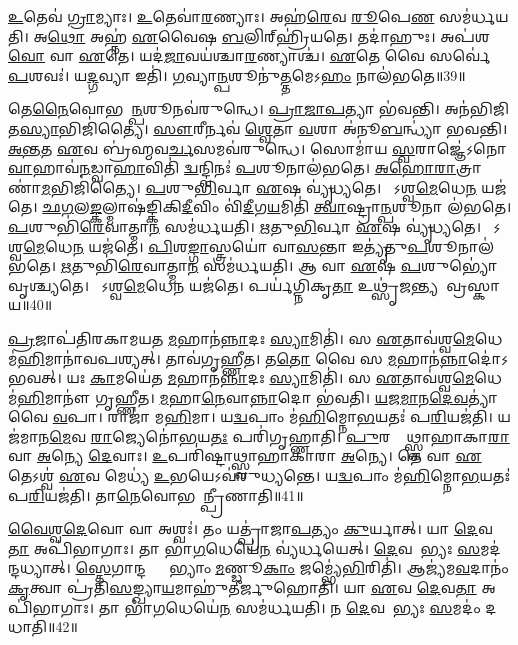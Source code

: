 \ul{𑌉}𑌤𑍇𑌵॑ \ul{𑌗𑍍𑌰𑌾}𑌮𑍍𑌯𑌾𑌃।
\ul{𑌉}𑌤𑍇𑌵𑌾॑\ul{𑌰}𑌣𑍍𑌯𑌾𑌃।
𑌅𑌹॑\ul{𑌰𑍇}𑌵 \ul{𑌰𑍂}𑌪𑍇\ul{𑌣} 𑌸𑌮॑𑌰𑍍𑌧𑌯𑌤𑌿।
𑌅\ul{𑌥𑍋} 𑌅𑌹𑍍𑌨॑ \ul{𑌏}𑌵𑍈𑌷 \ul{𑌬}𑌲𑌿𑌰𑍍‌\mbox{}𑌹𑍍𑌰𑌿॑𑌯𑌤𑍇।
𑌤𑌦𑌾॑𑌹𑍁𑌃।
𑌅𑌪॑𑌶\ul{𑌵𑍋} 𑌵𑌾 \ul{𑌏}𑌤𑍇।
𑌯𑌦॑\ul{𑌜𑌾}𑌵𑌯॑𑌶𑍍𑌚𑌾\ul{𑌰}𑌣𑍍𑌯𑌾𑌶𑍍𑌚॑।
\ul{𑌏}𑌤𑍇 𑌵𑍈 𑌸𑌰𑍍𑌵𑍇॑ \ul{𑌪}𑌶𑌵𑌃॑।
𑌯\ul{𑌦𑍍𑌗}𑌵𑍍𑌯𑌾 𑌇𑌤𑌿॑।
\ul{𑌗}𑌵𑍍𑌯𑌾\ul{𑌨𑍍𑌪}𑌶𑍂𑌨𑍁॑\ul{𑌤𑍍𑌤}𑌮𑍇𑌽\ul{𑌹𑌂} 𑌨𑌾𑌲॑𑌭𑌤𑍇॥39॥

𑌤𑍇\ul{𑌨𑍈}𑌵𑍋𑌭𑌯𑌾᳚\ul{𑌨𑍍𑌪}𑌶𑍂𑌨𑌵॑𑌰𑍁𑌨𑍍𑌧𑍇।
\ul{𑌪𑍍𑌰𑌾}\ul{𑌜𑌾}\ul{𑌪}𑌤𑍍𑌯𑌾 𑌭॑𑌵𑌨𑍍𑌤𑌿।
𑌅𑌨॑𑌭𑌿𑌜𑌿𑌤\ul{𑌸𑍍𑌯𑌾}𑌭𑌿𑌜𑌿॑𑌤𑍍𑌯𑍈।
\ul{𑌸𑍗}𑌰𑍀𑌰𑍍𑌨𑌵॑ \ul{𑌶𑍍𑌵𑍇}𑌤𑌾 \ul{𑌵}𑌶𑌾 𑌅॑𑌨𑍂\ul{𑌬}𑌨𑍍𑌧𑍍𑌯𑌾॑ 𑌭𑌵𑌨𑍍𑌤𑌿।
\ul{𑌅}\ul{𑌨𑍍𑌤}𑌤 \ul{𑌏}𑌵 𑌬𑍍𑌰॑𑌹𑍍𑌮𑌵\ul{𑌰𑍍𑌚}𑌸𑌮𑌵॑𑌰𑍁𑌨𑍍𑌧𑍇।
𑌸𑍋𑌮𑌾॑𑌯 \ul{𑌸𑍍𑌵}𑌰𑌾𑌜𑍍𑌞𑍇॑\-𑌽𑌨𑍋\ul{𑌵𑌾}𑌹𑌾𑌵॑\ul{𑌨}𑌡𑍍𑌵𑌾\ul{𑌹𑌾}𑌵𑌿𑌤𑌿॑ \ul{𑌦𑍍𑌵}𑌨𑍍𑌦𑍍𑌵𑌿𑌨𑌃॑ \ul{𑌪}𑌶𑍂𑌨𑌾𑌲॑𑌭𑌤𑍇।
\ul{𑌅}\ul{𑌹𑍋}\ul{𑌰𑌾}𑌤𑍍𑌰𑌾𑌣𑌾॑\ul{𑌮}𑌭𑌿𑌜𑌿॑𑌤𑍍𑌯𑍈।
\ul{𑌪}𑌶𑍁\ul{𑌭𑌿}𑌰𑍍𑌵𑌾 \ul{𑌏}𑌷 𑌵𑍍𑌯𑍃॑𑌧𑍍𑌯𑌤𑍇।
𑌯𑍋᳚𑌽𑌶𑍍𑌵\ul{𑌮𑍇}𑌧𑍇\ul{𑌨} 𑌯𑌜॑𑌤𑍇।
\ul{𑌛}\ul{𑌗}𑌲\ul{𑌙𑍍𑌕}𑌲𑍍𑌮𑌾𑌷॑𑌙𑍍𑌕𑌿𑌕𑌿\ul{𑌦𑍀}𑌵𑌿𑌂 𑌵𑌿॑\ul{𑌦𑍀}𑌗\ul{𑌯}𑌮𑌿𑌤𑌿॑ \ul{𑌤𑍍𑌵𑌾}𑌷𑍍𑌟𑍍𑌰𑌾\ul{𑌨𑍍𑌪}𑌶𑍂𑌨𑌾 𑌲॑𑌭𑌤𑍇।
\ul{𑌪}𑌶𑍁𑌭𑌿॑\ul{𑌰𑍇}𑌵𑌾𑌤𑍍𑌮𑌾\ul{𑌨}\ul{} 𑌸𑌮॑𑌰𑍍𑌧𑌯𑌤𑌿।
\ul{𑌋}𑌤𑍁\ul{𑌭𑌿}𑌰𑍍𑌵𑌾 \ul{𑌏}𑌷 𑌵𑍍𑌯𑍃॑𑌧𑍍𑌯𑌤𑍇।
𑌯𑍋᳚𑌽𑌶𑍍𑌵\ul{𑌮𑍇}𑌧𑍇\ul{𑌨} 𑌯𑌜॑𑌤𑍇।
\ul{𑌪𑌿}𑌶\ul{𑌙𑍍𑌗𑌾}𑌸𑍍𑌤𑍍𑌰𑌯𑍋॑ 𑌵𑌾\ul{𑌸}𑌨𑍍𑌤𑌾 𑌇𑌤𑍍𑌯𑍃॑𑌤𑍁\ul{𑌪}𑌶𑍂𑌨𑌾𑌲॑𑌭𑌤𑍇।
\ul{𑌋}𑌤𑍁𑌭𑌿॑\ul{𑌰𑍇}𑌵𑌾𑌤𑍍𑌮𑌾\ul{𑌨}\ul{} 𑌸𑌮॑𑌰𑍍𑌧𑌯𑌤𑌿।
𑌆 𑌵𑌾 \ul{𑌏}𑌷 \ul{𑌪}𑌶𑍁𑌭𑍍𑌯𑍋॑ 𑌵𑍃𑌶𑍍𑌚𑍍𑌯𑌤𑍇।
𑌯𑍋᳚𑌽𑌶𑍍𑌵\ul{𑌮𑍇}𑌧𑍇\ul{𑌨} 𑌯𑌜॑𑌤𑍇।
𑌪𑌰𑍍𑌯॑𑌗𑍍𑌨𑌿𑌕𑍃\ul{𑌤𑌾} 𑌉𑌥𑍍𑌸𑍃॑\ul{𑌜}𑌨𑍍𑌤𑍍𑌯𑌨𑌾᳚𑌵𑍍𑌰𑌸𑍍𑌕𑌾𑌯॥40॥\anuvakamend[\ul{𑌲}\ul{𑌭𑍍𑌯}\ul{𑌨𑍍𑌤𑍇} \ul{𑌲}\ul{𑌭}\ul{𑌤𑍇} \ul{𑌤𑍍𑌵𑌾}𑌷𑍍𑌟𑍍𑌰𑌾\ul{𑌨𑍍𑌪}𑌶𑍂𑌨𑌾𑌲॑𑌭\ul{𑌤𑍇}\-𑌽𑌷𑍍𑌟𑍗 𑌚॑]

\ul{𑌪𑍍𑌰}𑌜𑌾𑌪॑𑌤𑌿𑌰𑌕𑌾𑌮𑌯𑌤 \ul{𑌮}𑌹𑌾𑌨॑\ul{𑌨𑍍𑌨𑌾}𑌦𑌃 \ul{𑌸𑍍𑌯𑌾}𑌮𑌿𑌤𑌿॑।
𑌸 \ul{𑌏}𑌤𑌾𑌵॑𑌶𑍍𑌵\ul{𑌮𑍇}𑌧𑍇 𑌮॑\ul{𑌹𑌿}𑌮𑌾𑌨𑌾॑𑌵𑌪𑌶𑍍𑌯𑌤𑍍।
𑌤𑌾𑌵॑𑌗𑍃𑌹𑍍𑌣𑍀𑌤।
𑌤\ul{𑌤𑍋} 𑌵𑍈 𑌸 \ul{𑌮}𑌹𑌾𑌨॑\ul{𑌨𑍍𑌨𑌾}𑌦𑍋॑\-𑌽𑌭𑌵𑌤𑍍।
𑌯𑌃 \ul{𑌕𑌾}𑌮𑌯𑍇॑𑌤 \ul{𑌮}𑌹𑌾𑌨॑\ul{𑌨𑍍𑌨𑌾}𑌦𑌃 \ul{𑌸𑍍𑌯𑌾}𑌮𑌿𑌤𑌿॑।
𑌸 \ul{𑌏}𑌤𑌾𑌵॑𑌶𑍍𑌵\ul{𑌮𑍇}𑌧𑍇 𑌮॑\ul{𑌹𑌿}𑌮𑌾𑌨𑍗॑ 𑌗𑍃𑌹𑍍𑌣𑍀𑌤।
\ul{𑌮}𑌹𑌾\ul{𑌨𑍇}𑌵𑌾\ul{𑌨𑍍𑌨𑌾}𑌦𑍋 𑌭॑𑌵𑌤𑌿।
\ul{𑌯}\ul{𑌜}\ul{𑌮𑌾}\ul{𑌨}\ul{𑌦𑍇}\ul{𑌵}𑌤𑍍𑌯𑌾॑ 𑌵𑍈 \ul{𑌵}𑌪𑌾।
𑌰𑌾𑌜𑌾॑ 𑌮\ul{𑌹𑌿}𑌮𑌾।
𑌯\ul{𑌦𑍍𑌵}𑌪𑌾𑌂 𑌮॑\ul{𑌹𑌿}𑌮𑍍𑌨𑍋\ul{𑌭}𑌯𑌤𑌃॑ 𑌪\ul{𑌰𑌿}𑌯𑌜॑𑌤𑌿।
𑌯𑌜॑𑌮𑌾𑌨\ul{𑌮𑍇}𑌵 \ul{𑌰𑌾}𑌜𑍍𑌯𑍇𑌨𑍋॑\ul{𑌭}𑌯\ul{𑌤𑌃} 𑌪𑌰𑌿॑𑌗𑍃𑌹𑍍𑌣𑌾𑌤𑌿।
\ul{𑌪𑍁}𑌰𑌸𑍍𑌤𑌾᳚𑌥𑍍𑌸𑍍𑌵𑌾𑌹𑌾𑌕𑌾\ul{𑌰𑌾} 𑌵𑌾 \ul{𑌅}𑌨𑍍𑌯𑍇 \ul{𑌦𑍇}𑌵𑌾𑌃।
\ul{𑌉}𑌪𑌰𑌿॑𑌷𑍍𑌟𑌾𑌥𑍍𑌸𑍍𑌵𑌾𑌹𑌾𑌕𑌾𑌰𑌾 \ul{𑌅}𑌨𑍍𑌯𑍇।
𑌤𑍇 𑌵𑌾 \ul{𑌏}𑌤𑍇\-𑌽𑌶𑍍𑌵॑ \ul{𑌏}𑌵 𑌮𑍇𑌧𑍍𑌯॑ \ul{𑌉}𑌭𑌯𑍇\-𑌽𑌵॑𑌰𑍁𑌧𑍍𑌯𑌨𑍍𑌤𑍇।
𑌯\ul{𑌦𑍍𑌵}𑌪𑌾𑌂 𑌮॑\ul{𑌹𑌿}𑌮𑍍𑌨𑍋\ul{𑌭}𑌯𑌤𑌃॑ 𑌪\ul{𑌰𑌿}𑌯𑌜॑𑌤𑌿।
𑌤𑌾\ul{𑌨𑍇}𑌵𑍋𑌭𑌯𑌾᳚𑌨𑍍𑌪𑍍𑌰𑍀𑌣𑌾𑌤𑌿॥41॥\anuvakamend[\ul{𑌪}\ul{𑌰𑌿}𑌯𑌜॑\ul{𑌤𑌿} 𑌷𑌟𑍍𑌚॑]

\ul{𑌵𑍈}\ul{𑌶𑍍𑌵}\ul{𑌦𑍇}𑌵𑍋 𑌵𑌾 𑌅𑌶𑍍𑌵𑌃॑।
𑌤𑌂 𑌯𑌤𑍍𑌪𑍍𑌰𑌾॑𑌜𑌾\ul{𑌪}𑌤𑍍𑌯𑌂 \ul{𑌕𑍁}𑌰𑍍𑌯𑌾𑌤𑍍।
𑌯𑌾 \ul{𑌦𑍇}𑌵\ul{𑌤𑌾} 𑌅𑌪𑌿॑𑌭𑌾𑌗𑌾𑌃।
𑌤𑌾 𑌭𑌾॑\ul{𑌗}𑌧𑍇𑌯𑍇॑\ul{𑌨} 𑌵𑍍𑌯॑𑌰𑍍𑌧𑌯𑍇𑌤𑍍।
\ul{𑌦𑍇}𑌵𑌤𑌾᳚𑌭𑍍𑌯𑌃 \ul{𑌸}𑌮𑌦॑𑌨𑍍𑌦𑌧𑍍𑌯𑌾𑌤𑍍।
\ul{𑌸𑍍𑌤𑍇}𑌗𑌾𑌨𑍍𑌦𑌷𑍍𑌟𑍍𑌰𑌾᳚𑌭𑍍𑌯𑌾𑌂 \ul{𑌮}𑌣𑍍𑌡𑍂\ul{𑌕𑌾𑌂} 𑌜𑌮𑍍𑌭𑍍𑌯𑍇॑\ul{𑌭𑌿}𑌰𑌿𑌤𑌿॑।
𑌆𑌜𑍍𑌯॑𑌮\ul{𑌵}𑌦𑌾𑌨𑌂॑ \ul{𑌕𑍃}𑌤𑍍𑌵𑌾 𑌪𑍍𑌰॑𑌤𑌿\ul{𑌸}𑌙𑍍𑌖𑍍𑌯𑌾\ul{𑌯}𑌮𑌾𑌹𑍁॑𑌤𑍀𑌰𑍍𑌜𑍁𑌹𑍋𑌤𑌿।
𑌯𑌾 \ul{𑌏}𑌵 \ul{𑌦𑍇}𑌵\ul{𑌤𑌾} 𑌅𑌪𑌿॑𑌭𑌾𑌗𑌾𑌃।
𑌤𑌾 𑌭𑌾॑\ul{𑌗}𑌧𑍇𑌯𑍇॑\ul{𑌨} 𑌸𑌮॑𑌰𑍍𑌧𑌯𑌤𑌿।
𑌨 \ul{𑌦𑍇}𑌵𑌤𑌾᳚𑌭𑍍𑌯𑌃 \ul{𑌸}𑌮𑌦𑌂॑ 𑌦𑌧𑌾𑌤𑌿॥42॥

